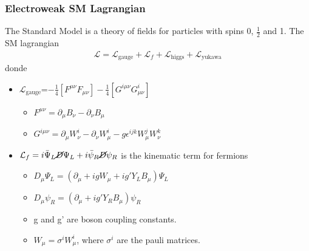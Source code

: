 \documentclass[11pt]{beamer}
\begin{document}
\begin{frame}
\frametitle{Electroweak SM Lagrangian}
The Standard Model is a theory of fields for particles with spins 0, $\frac{1}{2}$ and 1. 
The  SM lagrangian 	
\begin{align*}
\mathcal{L}=\mathcal{L}_\text{gauge}+\mathcal{L}_f +\mathcal{L}_\text{higgs} + \mathcal{L}_\text{yukawa}
\end{align*}
donde 
\begin{itemize}
	\item $\mathcal{L}_\text{gauge}$=$ -\frac{1}{4}\left[F^{\mu\nu}F_{\mu\nu}\right]-\frac{1}{4}\left[G^{i\mu\nu}G^i_{\mu\nu}\right]$ 
	\begin{itemize}
		\item  $F^{\mu \nu}=\partial_\mu B_\nu -\partial_\nu B_\mu $
		\item  $G^{i\mu\nu}=\partial_\mu W^i_\nu -\partial_\nu W^i_\mu -g\epsilon^{ijk}W^j_\mu W^k_\nu $
	\end{itemize}
	\item $\mathcal{L}_f=i\bar{\Psi}_L \cancel{D}{\Psi}_L+i\bar{\psi}_R \cancel{D}{\psi}_R  $ is the kinematic term for fermions 
\scriptsize{
	\begin{itemize}
		\item $D_\mu {\Psi}_L=\left(\partial_\mu+igW_\mu+ig'Y_LB_\mu\right)\Psi_L$
		\item $D_\mu \psi_R=\left(\partial_\mu +ig' Y_RB_\mu\right)\psi_R $
		\item g and g' are boson coupling constants.
\item $W_\mu=\sigma^iW^i_\mu$, where $\sigma^i$ are the pauli matrices.
	\end{itemize}
}
\end{itemize}
\end{frame}
\end{document}
